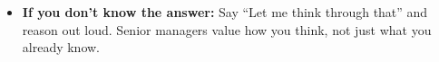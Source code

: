 \documentclass[letterpaper,10pt]{article}
\begin{document}
\begin{itemize}[leftmargin=*, itemsep=4pt]
  \item \textbf{If you don't know the answer:} Say ``Let me think through that'' and reason out loud. Senior managers value how you think, not just what you already know.
\end{itemize}
\end{document}
